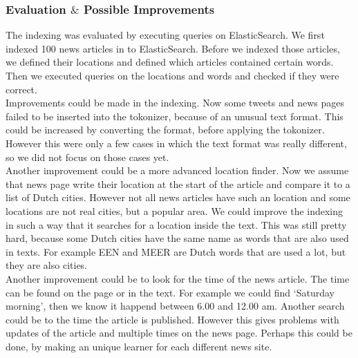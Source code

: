 \subsubsection*{Evaluation $\&$ Possible Improvements }
The indexing was evaluated by executing queries on ElasticSearch. 
We first indexed 100 news articles in to ElasticSearch.
Before we indexed those articles, we defined their locations and defined which articles contained certain words.
Then we executed queries on the locations and words and checked if they were correct. \\
Improvements could be made in the indexing. Now some tweets and news pages failed to be inserted into the tokonizer, because of an unusual text format. 
This could be increased by converting the format, before applying the tokonizer. 
However this were only a few cases in which the text format was really different, so we did not focus on those cases yet. \\
Another improvement could be a more advanced location finder. 
Now we assume that news page write their location at the start of the article and compare it to a list of Dutch cities.
However not all news articles have such an location and some locations are not real cities, but a popular area. 
We could improve the indexing in such a way that it searches for a location inside the text. This was still pretty hard, because some Dutch cities have the same name as words that are also used in texts. For example EEN and MEER are Dutch words that are used a lot, but they are also cities. \\
Another improvement could be to look for the time of the news article. The time can be found on the page or in the text. 
For example we could find `Saturday morning', then we know it happend between 6.00 and 12.00 am. 
Another search could be to the time the article is published. 
However this gives problems with updates of the article and multiple times on the news page. 
Perhaps this could be done, by making an unique learner for each different news site. 